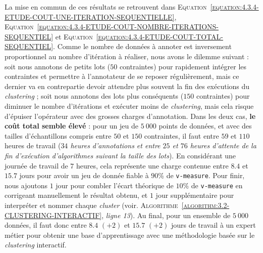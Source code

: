 			La mise en commun de ces résultats se retrouvent dans \textsc{Equation~\ref{equation:4.3.4-ETUDE-COUT-UNE-ITERATION-SEQUENTIELLE}}, \textsc{Equation~\ref{equation:4.3.4-ETUDE-COUT-NOMBRE-ITERATIONS-SEQUENTIEL}} et \textsc{Equation~\ref{equation:4.3.4-ETUDE-COUT-TOTAL-SEQUENTIEL}}.
			Comme le nombre de données à annoter est inversement proportionnel au nombre d'itération à réaliser, nous avons le dilemme suivant : soit nous annotons de petits lots ($50$ contraintes) pour rapidement intégrer les contraintes et permettre à l'annotateur de se reposer régulièrement, mais ce dernier va en contrepartie devoir attendre plus souvent la fin des exécutions du \textit{clustering} ; soit nous annotons des lots plus conséquents ($150$ contraintes) pour diminuer le nombre d'itérations et exécuter moins de \textit{clustering}, mais cela risque d'épuiser l'opérateur avec des grosses charges d'annotation.
			Dans les deux cas, \textbf{le coût total semble élevé} : pour un jeu de $5~000$ points de données, et avec des tailles d'échantillons compris entre $50$ et $150$ contraintes, il faut entre $59$ et $110$ heures de travail (\textit{$34$ heures d'annotations et entre $25$ et $76$ heures d'attente de la fin d'exécution d'algorithmes suivant la taille des lots}).
			En considérant une journée de travail de $7$ heures, cela représente une charge contenue entre $8.4$ et $15.7$ jours pour avoir un jeu de donnée fiable à $90$\% de \texttt{v-measure}.
			Pour finir, nous ajoutons $1$ jour pour combler l'écart théorique de $10$\% de \texttt{v-measure} en corrigeant manuellement le résultat obtenu, et $1$ jour supplémentaire pour interpréter et nommer chaque \textit{cluster} (voir. \textsc{Algorithme~\ref{algorithm:3.2-CLUSTERING-INTERACTIF}}, \textit{ligne 13}).
			Au final, pour un ensemble de $5~000$ données, il faut donc entre $8.4$ {\footnotesize $(+2)$} et $15.7$ {\footnotesize $(+2)$} jours de travail à un expert métier pour obtenir une base d'apprentissage avec une méthodologie basée sur le \textit{clustering} interactif.
			

